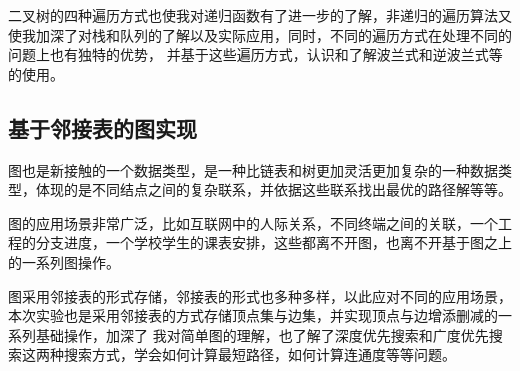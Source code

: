 \documentclass[supercite]{Experimental_Report}
\theoremstyle{definition}
\begin{document}
二叉树的四种遍历方式也使我对递归函数有了进一步的了解，非递归的遍历算法又使我加深了对栈和队列的了解以及实际应用，同时，不同的遍历方式在处理不同的问题上也有独特的优势，
并基于这些遍历方式，认识和了解波兰式和逆波兰式等的使用。

\subsection{基于邻接表的图实现}
图也是新接触的一个数据类型，是一种比链表和树更加灵活更加复杂的一种数据类型，体现的是不同结点之间的复杂联系，并依据这些联系找出最优的路径解等等。

图的应用场景非常广泛，比如互联网中的人际关系，不同终端之间的关联，一个工程的分支进度，一个学校学生的课表安排，这些都离不开图，也离不开基于图之上的一系列图操作。

图采用邻接表的形式存储，邻接表的形式也多种多样，以此应对不同的应用场景，本次实验也是采用邻接表的方式存储顶点集与边集，并实现顶点与边增添删减的一系列基础操作，加深了
我对简单图的理解，也了解了深度优先搜索和广度优先搜索这两种搜索方式，学会如何计算最短路径，如何计算连通度等等问题。





\end{document}
